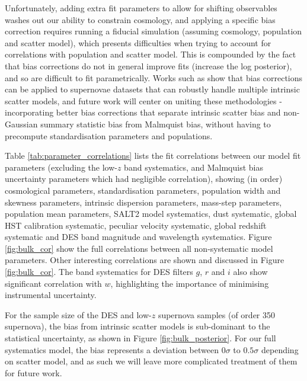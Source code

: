 \documentclass[a4paper,fleqn,usenatbib]{mnras}
\newcommand{\gten}{\citetalias{Guy2010}}
\newcommand{\celeven}{\citetalias{Chotard2011}}
\begin{document}
Unfortunately, adding extra fit parameters to allow for shifting observables washes out our ability to constrain cosmology, and applying a specific bias correction requires running a fiducial simulation (assuming cosmology, population and scatter model), which presents difficulties when trying to account for correlations with population and scatter model. This is compounded by the fact that bias corrections do not in general improve fits (increase the log posterior), and so are difficult to fit parametrically. Works such as \citet{Kessler2017} show that bias corrections can be applied to supernovae datasets that can robustly handle multiple intrinsic scatter models, and future work will center on uniting these methodologies - incorporating better bias corrections that separate intrinsic scatter bias and non-Gaussian summary statistic bias from Malmquist bias, without having to precompute standardisation parameters and populations.




Table \ref{tab:parameter_correlations} lists the fit correlations between our model fit parameters (excluding the low-$z$ band systematics, and Malmquist bias uncertainty parameters which had negligible correlation), showing (in order) cosmological parameters, standardisation parameters, population width and skewness parameters, intrinsic dispersion parameters, mass-step parameters, population mean parameters, SALT2 model systematics, dust systematic, global HST calibration systematic, peculiar velocity systematic, global redshift systematic and DES band magnitude and wavelength systematics. Figure \ref{fig:bulk_cor} show the full correlations between all non-systematic model parameters. Other interesting correlations are shown and discussed in Figure \ref{fig:bulk_cor}. The band systematics for DES filters $g$, $r$ and $i$ also show significant correlation with $w$, highlighting the importance of minimising instrumental uncertainty.


For the sample size of the DES and low-$z$ supernova samples (of order 350 supernova), the bias from intrinsic scatter models is sub-dominant to the statistical uncertainty, as shown in Figure \ref{fig:bulk_posterior}. For our full systematics model, the bias represents a deviation between $0\sigma$ to $0.5\sigma$ depending on scatter model, and as such we will leave more complicated treatment of them for future work.
\end{document}
